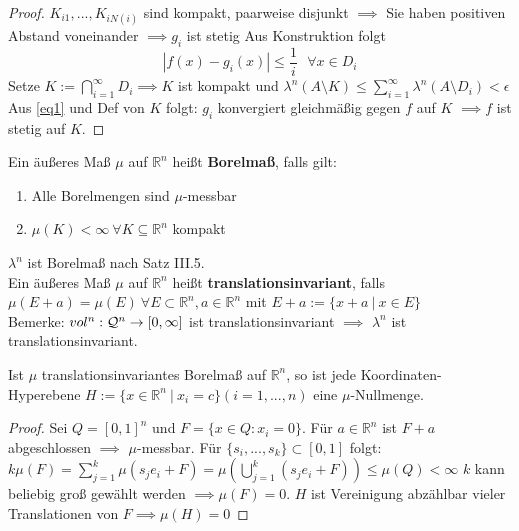 \begin{proof}
	$K_{i1}, ...,K_{iN(i)}$ sind kompakt, paarweise disjunkt \newline 
	$\implies$ Sie haben positiven Abstand voneinander \newline
	$\implies g_i$ ist stetig \newline
	Aus Konstruktion folgt \begin{equation}
	|f(x) - g_i(x)| \leq \frac{1}{i} \text{ } \forall x\in D_i
	\label{eq1}
	\end{equation}
	Setze $K:= \bigcap\limits_{i=1}^{\infty} D_i \implies K$ ist kompakt und $\lambda^n(A\setminus K) \leq \sum\limits_{i=1}^{\infty}\lambda^n(A\setminus D_i) < \epsilon$ \newline
	Aus \ref{eq1} und Def von $K$ folgt: $g_i$ konvergiert gleichmäßig gegen $f$ auf $K$ $\implies f$ ist stetig auf $K$. 
	\end{proof}


  \begin{definition}
    Ein äußeres Maß $\mu$ auf $\mathbb{R}^n$ heißt \textbf{Borelmaß}, falls gilt:
    \begin{enumerate}
      \item Alle Borelmengen sind $\mu$-messbar
      \item $\mu(K)<\infty \ \forall K \subseteq \mathbb{R}^n$ kompakt
    \end{enumerate}
  \end{definition}

  \begin{remark}
    $\lambda^n$ ist Borelmaß nach Satz III.5.\\
    Ein äußeres Maß $\mu$ auf $\mathbb{R}^n$ heißt \textbf{translationsinvariant}, falls \\
    $\mu(E + a) = \mu(E) \ \forall E \subset \mathbb{R}^n, a \in \mathbb{R}^n$ mit $E + a := \{x + a \ | \ x \in E\}$\\
    Bemerke: $vol^n:\mathcal{Q}^n \to [0, \infty]$ ist translationsinvariant $\implies$ $\lambda^n$ ist translationsinvariant.
  \end{remark}

  \begin{lemma}
    Ist $\mu$ translationsinvariantes Borelmaß auf $\mathbb{R}^n$, so ist jede Koordinaten-Hyperebene $H := \{x \in \mathbb{R}^n \ | \ x_i = c\} (i=1,...,n)$ eine $\mu$-Nullmenge.
  \end{lemma}

  \begin{proof}
      Sei $Q = [0,1]^n$ und $F = \{x\in Q: x_i = 0\}$. Für $a\in\mathbb{R}^n$ ist $F+a$ abgeschlossen $\implies$ $\mu$-messbar. Für $\{s_i, ..., s_k\} \subset [0,1]$ folgt: \newline $k\mu(F) = \sum\limits_{j=1}^{k}\mu(s_j e_i + F) = \mu(\bigcup\limits_{j=1}^{k}(s_j e_i + F)) \leq \mu(Q) < \infty$  \newline
$k$ kann beliebig groß gewählt werden $\implies \mu(F) = 0$. \newline
$H$ ist Vereinigung abzählbar vieler Translationen von $F \implies \mu(H) = 0$
  \end{proof}

